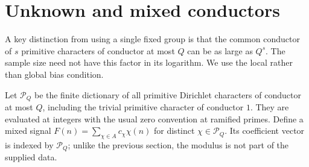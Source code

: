 \documentclass[11pt]{article}
\theoremstyle{definition}\newtheorem{remark}[theorem]{Remark}
\begin{document}
\section{Unknown and mixed conductors}
\label{sec:mixed}
A key distinction from using a single fixed group is that the common conductor of $s$ primitive characters of conductor at most $Q$ can be as large as $Q^s$. The sample size need not have this factor in its logarithm. We use the local rather than global bias condition.

Let $\mathcal P_Q$ be the finite dictionary of all primitive Dirichlet characters of conductor at most $Q$, including the trivial primitive character of conductor $1$. They are evaluated at integers with the usual zero convention at ramified primes. Define a mixed signal $F(n)=\sum_{\chi\in A}c_\chi\chi(n)$ for distinct $\chi\in\mathcal P_Q$. Its coefficient vector is indexed by $\mathcal P_Q$; unlike the previous section, the modulus is not part of the supplied data.
\end{document}

